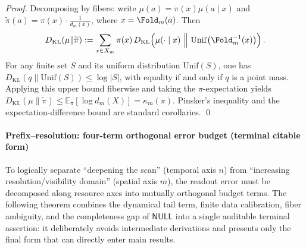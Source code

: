 \begin{proof}
Decomposing by fibers: write \(\mu(a)=\pi(x)\mu(a\mid x)\) and \(\widetilde\pi(a)=\pi(x)\cdot \frac{1}{d_m(x)}\), where \(x=\Fold_m(a)\).
Then
\[
D_{\mathrm{KL}}(\mu\|\widetilde\pi)
:=\sum_{x\in X_m}\pi(x)\,D_{\mathrm{KL}}\!\left(\mu(\cdot\mid x)\ \Big\|\ \mathrm{Unif}\big(\Fold_m^{-1}(x)\big)\right).
\]
For any finite set \(S\) and its uniform distribution \(\mathrm{Unif}(S)\), one has \(D_{\mathrm{KL}}(q\|\mathrm{Unif}(S))\le \log|S|\), with equality if and only if \(q\) is a point mass.
Applying this upper bound fiberwise and taking the \(\pi\)-expectation yields \(D_{\mathrm{KL}}(\mu\|\widetilde\pi)\le \mathbb{E}_\pi[\log d_m(X)]=\kappa_m(\pi)\).
Pinsker's inequality and the expectation-difference bound are standard corollaries. \qed
\end{proof}

\paragraph{Prefix--resolution: four-term orthogonal error budget (terminal citable form)}
To logically separate ``deepening the scan'' (temporal axis \(n\)) from ``increasing resolution/visibility domain'' (spatial axis \(m\)), the readout error must be decomposed along resource axes into mutually orthogonal budget terms.
The following theorem combines the dynamical tail term, finite data calibration, fiber ambiguity, and the completeness gap of \(\mathsf{NULL}\) into a single auditable terminal assertion: it deliberately avoids intermediate derivations and presents only the final form that can directly enter main results.

